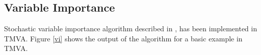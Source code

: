 \documentclass[a4paper]{jpconf}
\begin{document}
\subsection{Variable Importance}


Stochastic variable importance algorithm described in \cite{gleyzer2008paradigm}, 
has been implemented in TMVA. Figure \ref{vi} shows the output of the algorithm for a basic example in TMVA.






% 











\end{document}
